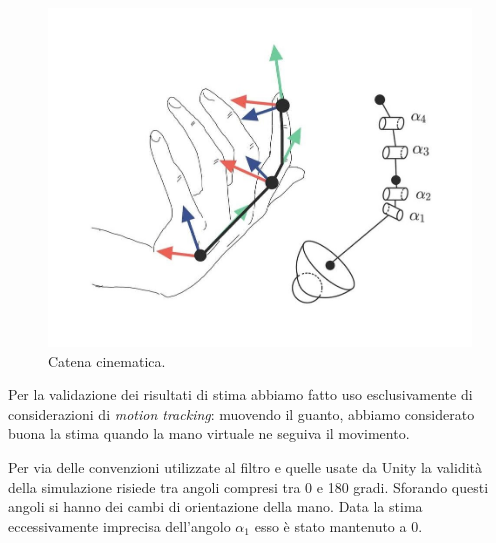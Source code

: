 \begin{figure}[H]
    \includegraphics[scale=0.45]{immagini/kinematics_chain.jpg}
    \centering
    \caption{Catena cinematica.}
\end{figure}

Per la validazione dei risultati di stima abbiamo fatto uso esclusivamente di considerazioni di \textit{motion tracking}: muovendo il guanto, abbiamo considerato buona la stima quando la mano virtuale ne seguiva il movimento.

Per via delle convenzioni utilizzate al filtro e quelle usate da Unity la validità della simulazione risiede tra angoli compresi tra 0 e 180 gradi. Sforando questi angoli si hanno dei cambi di orientazione della mano.
Data la stima eccessivamente imprecisa dell'angolo $\alpha_1$ esso è stato mantenuto a 0.\\

\clearpage

